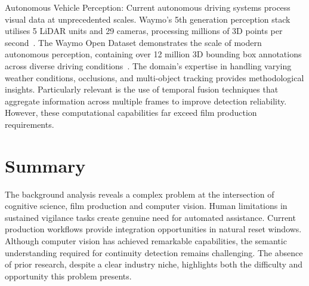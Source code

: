 Autonomous Vehicle Perception: Current autonomous driving systems process visual data at unprecedented scales. Waymo's 5th generation perception stack utilises 5 LiDAR units and 29 cameras, processing millions of 3D points per second~\cite{waymo2020}. The Waymo Open Dataset demonstrates the scale of modern autonomous perception, containing over 12 million 3D bounding box annotations across diverse driving conditions~\cite{sun2020}. The domain's expertise in handling varying weather conditions, occlusions, and multi-object tracking provides methodological insights. Particularly relevant is the use of temporal fusion techniques that aggregate information across multiple frames to improve detection reliability. However, these computational capabilities far exceed film production requirements.

\section{Summary}

The background analysis reveals a complex problem at the intersection of cognitive science, film production and computer vision. Human limitations in sustained vigilance tasks create genuine need for automated assistance. Current production workflows provide integration opportunities in natural reset windows. Although computer vision has achieved remarkable capabilities, the semantic understanding required for continuity detection remains challenging. The absence of prior research, despite a clear industry niche, highlights both the difficulty and opportunity this problem presents.